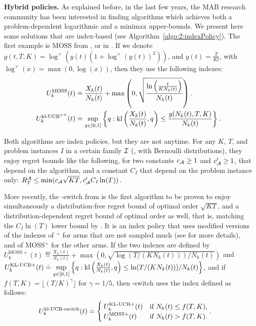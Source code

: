 \textbf{Hybrid policies.}
%
As explained before, in the last few years, the MAB research community has been interested in finding algorithms which achieves both a problem-dependent logarithmic and a minimax upper-bounds.
We present here some solutions that are index-based (see Algorithm~\ref{algo:2:indexPolicy}).
The first example is MOSS from \cite{Audibert2009minimax}, or \KLUCBpp{} in \cite{Menard17}.
If we denote $g(t, T, K) = \log^+(y(t) (1 + \log^+(y(t))^2))$, and $y(t) = \frac{T}{K t}$, with $\log^+(x) = \max(0, \log(x))$,
then they use the following indexes:
\begin{align*}\label{eq:2:indexes_for_MOSS_klUCBpp}
    U^{\mathrm{MOSS}}_k(t) & \overset{.}{=} \frac{X_k(t)}{N_k(t)} + \max\left(0, \sqrt{ \frac{\ln\left(\frac{t}{K N_k(t)}\right)}{N_k(t)} } \right). \\
    U^{\mathrm{kl}\text{-}\mathrm{UCB}^{++}}_k(t) & \overset{.}{=} \sup\limits_{q \in [0,1]} \left\{ q : \mathrm{kl}\left(\frac{X_k(t)}{N_k(t)}, q\right) \leq \frac{g(N_k(t), T, K)}{N_k(t)} \right\}.
\end{align*}

Both algorithms are index policies, but they are not anytime.
For any $K$, $T$, and problem instances $I$ in a certain family $\mathcal{I}$ (\eg, with Bernoulli distributions),
they enjoy regret bounds like the following, for two constants $c_{\mathcal{A}} \geq 1$ and $c'_{\mathcal{A}} \geq 1$, that depend on the algorithm, and a constant $C_I$ that depend on the problem instance only: $R_T^{\mathcal{A}} \leq \min( c_{\mathcal{A}} \sqrt{K T}, c'_{\mathcal{A}} C_I \ln(T))$.

More recently, the \klUCB-switch from \cite{GarivierHadiji2018} is the first algorithm to be proven to
enjoy simultaneously a distribution-free regret bound of optimal order $\sqrt{KT}$, and a distribution-dependent regret bound of optimal order as well, that is, matching the $C_I \ln(T)$ lower bound by \cite{LaiRobbins85}.
It is an index policy that uses modified versions of the indexes of \klUCB$^+$ for arms that are not sampled much (see \cite{Honda2019} for more details), and of MOSS$^+$ for the other arms.
If the two indexes
are defined by
$U^{\mathrm{MOSS}+}_k(t) \eqdef \frac{X_k(t)}{N_k(t)} + \max\left(0, \sqrt{ \log\left(T / (K N_k(t))\right) / N_k(t)} \right)$
and
$U^{\mathrm{KL}\text{-}\mathrm{UCB}+}_k(t) \overset{.}{=} \sup\limits_{q \in [0,1]} \left\{ q : \mathrm{kl}\left(\frac{X_k(t)}{N_k(t)}, q\right) \leq \ln(T / (K N_k(t))) / N_k(t) \right\}$,
and if $f(T, K) = \lfloor (T/K)^{\gamma}\rfloor$ for $\gamma=1/5$,
then \klUCB-switch uses the index defined as follows:
\begin{align*}
    U^{\mathrm{kl}\text{-}\mathrm{UCB}\text{-}\mathrm{switch}}_k(t) & \overset{.}{=} \begin{cases}
        U^{\mathrm{KL}\text{-}\mathrm{UCB}+}_k(t) & \text{if } N_k(t) \leq f(T, K), \\
        U^{\mathrm{MOSS}+}_k(t) & \text{if } N_k(t) > f(T, K).
    \end{cases}.
\end{align*}
%

